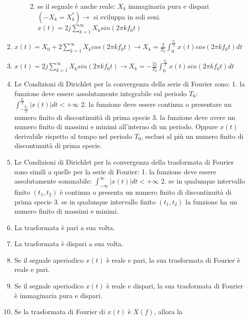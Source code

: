 \documentclass[
  paper=a4,
  ,captions=tableheading
]{scrartcl}
\providecommand{\tightlist}{%
  \setlength{\itemsep}{0pt}\setlength{\parskip}{0pt}}
\begin{document}
\begin{enumerate}
\begin{enumerate}
    \begin{enumerate}
    \def\labelenumiii{\arabic{enumiii}.}
    \tightlist
    \item
      se il segnale è anche reale: \(X_k\) immaginaria pura e dispari
      \((-X_k = X^*_k) \to\) si sviluppa in soli seni.
      \(\displaystyle x(t)= 2j \sum_{k=1}^{\infty} X_k sin (2\pi k f_0 t)\)
    \end{enumerate}
  \end{enumerate}
\item
  \(\displaystyle x(t)=X_0 + 2\sum_{k=1}^{\infty} X_k cos (2\pi k f_0 t) \to X_k = \frac{2}{T_0} \int_{0}^{\frac{T_0}{2}} x(t) cos (2\pi k f_0 t) dt\)
\item
  \(\displaystyle x(t)= 2j \sum_{k=1}^{\infty} X_k sin (2\pi k f_0 t) \to X_k = -\frac{2j}{T_0} \int_{0}^{\frac{T_0}{2}} x(t) sin (2\pi k f_0 t)dt\)
\item
  Le Condizioni di Dirichlet per la convergenza della serie di Fourier
  sono: 1. la funzione deve essere assolutamente integrabile sul periodo
  \(T_0\):
  \(\displaystyle \int_{-\frac{T_0}{2}}^{\frac{T_0}{2}} |x(t)| dt < +\infty\)
  2. la funzione deve essere continua o presentare un numero finito di
  discontinuità di prima specie 3. la funzione deve avere un numero
  finito di massimi e minimi all'interno di un periodo. Oppure \(x(t)\)
  derivabile rispetto al tempo nel periodo \(T_0\), esclusi al più un
  numero finito di discontinuità di prima specie.
\item
  Le Condizioni di Dirichlet per la convergenza della trasformata di
  Fourier sono simili a quelle per la serie di Fourier: 1. la funzione
  deve essere assolutamente sommabile:
  \(\displaystyle \int_{-\infty}^{\infty} |x(t)| dt < +\infty\) 2. se in
  qualunque intervallo finito \((t_1, t_2)\) è continua o presenta un
  numero finito di discontinuità di prima specie 3. se in qualunque
  intervallo finito \((t_1, t_2)\) la funzione ha un numero finito di
  massimi e minimi.
\item
  La trasformata è pari a sua volta.
\item
  La trasformata è dispari a sua volta.
\item
  Se il segnale aperiodico \(x(t)\) è reale e pari, la sua trasformata
  di Fourier è reale e pari.
\item
  Se il segnale aperiodico \(x(t)\) è reale e dispari, la sua
  trasformata di Fourier è immaginaria pura e dispari.
\item
  Se la trasformata di Fourier di \(x(t)\) è \(X(f)\), allora la

\end{enumerate}
\end{document}
